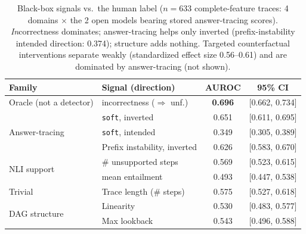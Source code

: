 \documentclass{article}
\begin{document}
\begin{table}[t]
\centering
\small
\begin{tabular}{@{}llcc@{}}
\toprule
\textbf{Family} & \textbf{Signal (direction)} & \textbf{AUROC} & \textbf{95\% CI} \\
\midrule
Oracle (not a detector) & incorrectness ($\Rightarrow$ unf.) & \textbf{0.696} & [0.662, 0.734] \\
\midrule
\multirow{3}{*}{Answer-tracing} & \texttt{soft}, inverted & 0.651 & [0.611, 0.695] \\
 & \texttt{soft}, intended & 0.349 & [0.305, 0.389] \\
 & Prefix instability, inverted & 0.626 & [0.583, 0.670] \\
\midrule
\multirow{2}{*}{NLI support} & \# unsupported steps & 0.569 & [0.523, 0.615] \\
 & mean entailment & 0.493 & [0.447, 0.538] \\
\midrule
Trivial & Trace length (\# steps) & 0.575 & [0.527, 0.618] \\
\midrule
\multirow{2}{*}{DAG structure} & Linearity & 0.530 & [0.483, 0.577] \\
 & Max lookback & 0.543 & [0.496, 0.588] \\
\bottomrule
\end{tabular}
\caption{Black-box signals vs.\ the human label ($n{=}633$ complete-feature traces: 4 domains $\times$ the 2 open models bearing stored answer-tracing scores). \emph{In}correctness dominates; answer-tracing helps only inverted (prefix-instability intended direction: 0.374); structure adds nothing. Targeted counterfactual interventions separate weakly (standardized effect size 0.56--0.61) and are dominated by answer-tracing (not shown).}
\label{tab:audit}
\end{table}
\end{document}
